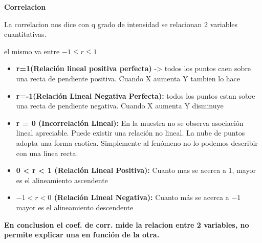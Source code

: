 \documentclass[10pt,a4paper]{article}
\begin{document}
\begin{minipage}[t]{0.40\textwidth}
\vspace{0pt}
\textbf{Correlacion}

{\small
La correlacion nos dice con q grado de intensidad se relacionan 2 variables cuantitativas.

el mismo va entre $-1 \leq r \leq 1$
\begin{itemize}[leftmargin=10pt,itemsep=1pt,topsep=1pt,parsep=0pt]
  \item \textbf{r=1(Relación lineal positiva perfecta)} -> todos los puntos caen sobre una recta de pendiente positiva. Cuando X aumenta Y tambien lo hace
  \item \textbf{r=-1(Relación Lineal Negativa Perfecta):} todos los puntos estan sobre una recta de pendiente negativa. Cuando X aumenta Y disminuye
  \item \textbf{r = 0 (Incorrelación Lineal):} En la muestra no se observa asociación lineal apreciable. Puede existir una relación no lineal. La nube de puntos adopta una forma caotica. Simplemente al fenómeno no lo podemos describir con una linea recta.
  \item \textbf{0 < r < 1 (Relación Lineal Positiva):} Cuanto mas se acerca a 1, mayor es el alineamiento ascendente
  \item \textbf{$-1<r<0$ (Relación Lineal Negativa):} Cuanto más se acerca a $-1$ mayor es el alineamiento descendente
\end{itemize}

\textbf{En conclusion el coef. de corr. mide la relacion entre 2 variables, no permite explicar una en función de la otra.}
}
\end{minipage}
\end{document}
